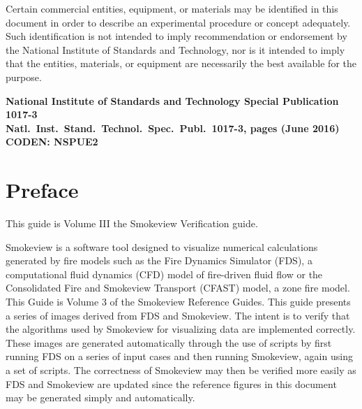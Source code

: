 \documentclass[11pt,twoside]{book}
\begin{document}
\begin{minipage}[t][9in][s]{6.5in}


\begin{flushright}
Certain commercial entities, equipment, or materials may be
identified in this document in order to describe an experimental procedure or concept
adequately. Such identification is not intended to imply recommendation or endorsement
by the National Institute of Standards and Technology, nor is it intended to imply that
the entities, materials, or equipment are necessarily the best available for the purpose.
\end{flushright}

\vspace{3in}


\vspace{3in}

\large
\begin{flushright}
\bf National Institute of Standards and Technology Special Publication 1017-3 \\
Natl.~Inst.~Stand.~Technol.~Spec.~Publ.~1017-3, \pageref{LastPage} pages (June 2016) \\
CODEN: NSPUE2
\end{flushright}

\vfill

\end{minipage}


\frontmatter

\pagestyle{plain}


\chapter{Preface}
\smvoverview
This guide is Volume III the  Smokeview Verification guide.

Smokeview is a software tool designed to visualize numerical calculations generated by fire models such as the Fire Dynamics Simulator (FDS), a computational fluid dynamics (CFD) model of fire-driven fluid flow or the Consolidated Fire and Smokeview Transport (CFAST) model, a zone fire model. This Guide is Volume 3 of the Smokeview Reference Guides.
This guide presents a series of images derived from FDS and Smokeview.
The intent is to verify that the algorithms used by Smokeview for visualizing
data are implemented correctly.
These images are generated automatically through the use of scripts by first running
FDS on a series of input cases and then running Smokeview, again using a set of scripts.
The correctness of Smokeview may then be verified more easily as FDS and
Smokeview are updated since the reference figures in this document may be
generated simply and automatically.
\end{document}
